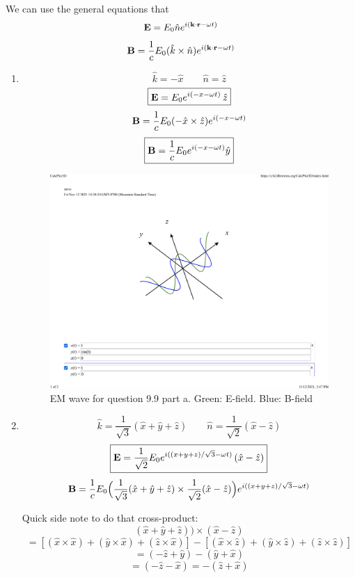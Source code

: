 \documentclass[12pt]{article}
\begin{document}
We can use the general equations that 
\[\vb{E} = E_0 \hat{n}e^{i(\vb{k}\cdot \vb{r} -\omega t)}\]
\[\vb{B} = \frac{1}{c}E_0 (\hat{k}\times \hat{n})e^{i(\vb{k}\cdot \vb{r} -\omega t)}\]


\begin{enumerate}[label=\alph*)]
\item 
\[\hat{k} = -\hat{x} \qquad \hat{n} = \hat{z}\]
\[\boxed{\vb{E} = E_0 e^{i(-x -\omega t)}\, \hat{z}}\]
\[\vb{B} = \frac{1}{c}E_0 (-\hat{x}\times \hat{z})e^{i(-x -\omega t)}\]
\[\boxed{\vb{B}= \frac{1}{c} E_0 e^{i(-x -\omega t)} \hat{y}}\]

\begin{figure}[!ht]
    \centering
    \label{fig:03_01}
    \caption{EM wave for question 9.9 part a. Green: E-field. Blue: B-field}
    \includegraphics[width=.6 \textwidth]{./hw09_03_01.pdf}
\end{figure}

\item 
\[\hat{k} = \frac{1}{\sqrt{3}}(\hat{x} + \hat{y} + \hat{z}) \qquad \hat{n} = \frac{1}{\sqrt{2}}(\hat{x}-\hat{z})\]
\[\boxed{\vb{E} = \frac{1}{\sqrt{2}} E_0  e^{i((x+y+z)/\sqrt{3} -\omega t)} \, (\hat{x}-\hat{z})}\]
\[\vb{B} = \frac{1}{c}E_0 \Big(\frac{1}{\sqrt{3}}(\hat{x} + \hat{y} + \hat{z})\times \frac{1}{\sqrt{2}}(\hat{x}-\hat{z})\Big)e^{i((x+y+z)/\sqrt{3} -\omega t)}\]
\bigskip

Quick side note to do that cross-product:
\[(\hat{x} + \hat{y} + \hat{z}))\times (\hat{x}-\hat{z})\]
\[=[(\hat{x}\times\hat{x}) + (\hat{y}\times\hat{x}) + (\hat{z}\times\hat{x})] - [(\hat{x}\times\hat{z}) + (\hat{y}\times\hat{z}) + (\hat{z}\times\hat{z})]\]
\[=(-\hat{z} + \hat{y})-(\hat{y} + \hat{x})\]
\[=(-\hat{z}-\hat{x}) = -(\hat{z}+\hat{x})\]
\bigskip


\end{enumerate}
\end{document}
